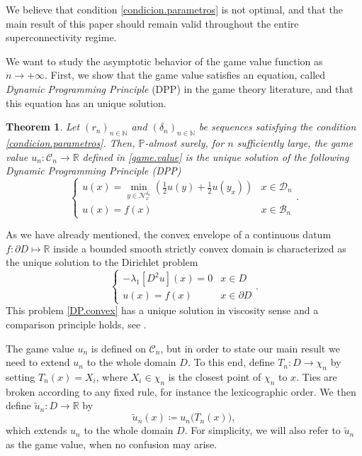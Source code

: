 \documentclass[11pt]{amsart}
\newtheorem{theorem}{Theorem}
\theoremstyle{definition}
\theoremstyle{remark}
\numberwithin{equation}{section}
\newcommand{\R}{{\mathbb R}}
\renewcommand{\P}{\mathbb{P}}
\newcommand{\Domain}{\mathcal{D}}
\newcommand{\B}{\mathcal{B}}
\newcommand{\C}{{\mathcal C}}
\newcommand{\Nc}{{\mathcal N}}
\begin{document}
We believe that condition \eqref{condicion.parametros} is not optimal, and that the main result of this paper should remain valid throughout the entire superconnectivity regime.

We want to study the asymptotic behavior of the game value function as $n \to +\infty$.
First, we show that the game value satisfies an equation, called {\it Dynamic Programming Principle} (DPP)
in the game theory literature, and that this equation has an unique solution.


\begin{theorem}
\label{game.value.holds.DPP}
Let $(r_n)_{n\in\mathbb{N}}$ and $(\delta_n)_{n\in\mathbb{N}}$ be sequences satisfying the condition \eqref{condicion.parametros}.
Then, $\P$-almost surely, for $n$ sufficiently large, the game value $u_n\colon \C_n\to \R$ defined in \eqref{game.value} is the unique solution of the following Dynamic Programming Principle (DPP)
\begin{equation}
\label{DPP.intro}
\begin{cases}
\displaystyle u(x)=\min\limits_{y\in \Nc_x^{\delta_n}} 
\left(
\frac{1}{2} 
u(y) 
+
\frac{1}{2}
u(y_x) 
\right)
& x\in \Domain_n \\
u(x)=f(x)
& x\in \B_n
\end{cases} 
.
\end{equation}
\end{theorem}


As we have already mentioned, the convex envelope of a continuous datum $f:\partial D
\mapsto \mathbb{R}$ inside a bounded smooth strictly convex domain is characterized as the 
unique solution to the Dirichlet problem 
\begin{equation}
\label{DP.convex}
\begin{cases}
-\lambda_1[D^2 u](x) = 0 
& x\in D \\
u(x)=f(x)
& x\in \partial D
\end{cases} 
.
\end{equation}
This problem \eqref{DP.convex} has a unique solution in viscosity sense and a comparison principle holds, see \cite{OS,Ober}. 

The game value $u_n$ is defined on $\mathcal{C}_n$, but in order to state our main result we need to extend $u_n$ to the whole domain $D$.
To this end, define $T_n \colon D \to \chi_n$ by setting $T_n(x)=X_i$, where $X_i\in \chi_n$ is the closest point of $\chi_n$ to $x$. 
Ties are broken according to any fixed rule, for instance the lexicographic order. 
We then define $\tilde u_n\colon D \to \mathbb{R}$ by
\[
\tilde u_n(x) \coloneqq u_n\bigl(T_n(x)\bigr),
\]
which extends $u_n$ to the whole domain $D$.
For simplicity, we will also refer to $\tilde{u}_n$ as the game value, when no confusion may arise.
\end{document}
